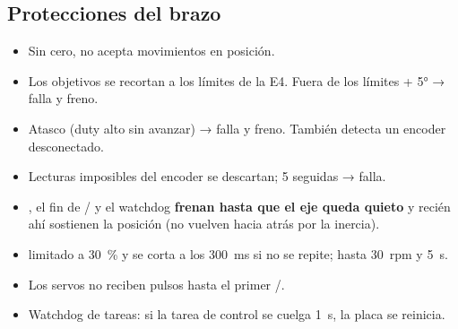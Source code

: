 \subsection{Protecciones del brazo}
\begin{itemize}
  \item Sin cero, no acepta movimientos en posición.
  \item Los objetivos se recortan a los límites de la E4. Fuera de los límites + 5° → falla y freno.
  \item Atasco (duty alto sin avanzar) → falla y freno. También detecta un encoder desconectado.
  \item Lecturas imposibles del encoder se descartan; 5 seguidas → falla.
  \item {}, el fin de / y el watchdog \textbf{frenan hasta que el eje queda quieto} y recién ahí
        sostienen la posición (no vuelven hacia atrás por la inercia).
  \item {} limitado a 30~\% y se corta a los 300~ms si no se repite;  hasta 30~rpm y 5~s.
  \item Los servos no reciben pulsos hasta el primer /.
  \item Watchdog de tareas: si la tarea de control se cuelga 1~s, la placa se reinicia.
\end{itemize}

